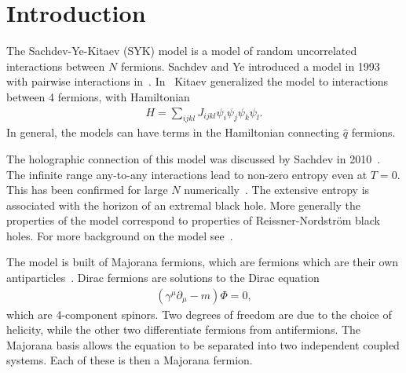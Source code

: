 \documentclass[12pt]{article} %
\begin{document}
\section{Introduction}

The Sachdev-Ye-Kitaev (SYK) model is a model of random uncorrelated interactions between $N$ fermions. Sachdev and Ye introduced a model in 1993 with pairwise interactions in~\cite{sachdev93}. In~\cite{kitaev15} Kitaev generalized the model to interactions between 4 fermions, with Hamiltonian
\begin{align}
H = \sum_{ijkl}J_{ijkl}\psi_i\psi_j\psi_k\psi_l.
\end{align} 
In general, the models can have terms in the Hamiltonian connecting $\hat{q}$ fermions. 

The holographic connection of this model was discussed by Sachdev in 2010~\cite{sachdev10}. The infinite range any-to-any interactions lead to non-zero entropy even at $T=0$. This has been confirmed for large $N$ numerically~\cite{Georges2001}. The extensive entropy is associated with the horizon of an extremal black hole. More generally the properties of the model correspond to properties of  Reissner-Nordstr\"om black holes. For more background on the model see~\cite{mald16}.

The model is built of Majorana fermions, which are fermions which are their own antiparticles~\cite{elliott14}. Dirac fermions are solutions to the Dirac equation
\begin{align}
(\gamma^\mu\partial_\mu - m)\Phi = 0,
\end{align}
which are 4-component spinors. Two degrees of freedom are due to the choice of helicity, while the other two differentiate fermions from antifermions. The Majorana basis allows the equation to be separated into two independent coupled systems. Each of these is then a Majorana fermion. 
\end{document}

